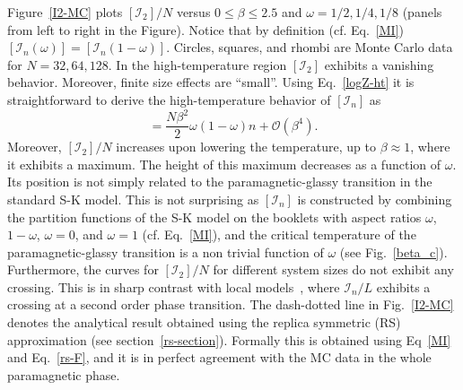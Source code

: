 \documentclass[twocolumn,superscriptaddress,prb,10pt]{revtex4-1}
\begin{document}
Figure~\ref{I2-MC} plots $[{\mathcal I}_2]/N$ versus $0\le\beta\le 2.5$ and $\omega=1/2,1/4,1/8$ 
(panels from left to right in the Figure). Notice that by definition (cf. Eq.~\eqref{MI}) 
$[{\mathcal I}_n(\omega)]=[{\mathcal I}_n(1-\omega)]$. Circles, squares, and rhombi 
are Monte Carlo data for $N=32,64,128$. In the high-temperature region $[{\mathcal I}_2]$ 
exhibits a vanishing behavior. Moreover, finite size effects are 
``small''. Using Eq.~\eqref{logZ-ht} it is straightforward to derive the high-temperature 
behavior of $[{\mathcal I}_n]$ as  
%
\begin{equation}
[{\mathcal I}_n]=\frac{N\beta^2}{2}\omega(1-\omega)n+{\mathcal O}
(\beta^4).
\end{equation}
%
Moreover, $[{\mathcal I}_2]/N$ increases upon lowering the temperature, up to $\beta\approx 1$, 
where it exhibits a maximum. The height of this  
maximum decreases as a function of $\omega$. Its position is not simply related to the 
paramagnetic-glassy transition in the standard S-K model. This is not surprising 
as $[{\mathcal I}_n]$ is constructed by combining the partition functions of the S-K model 
on the booklets with aspect ratios $\omega$, $1-\omega$, $\omega=0$, and $\omega=1$ (cf. Eq.~\eqref{MI}), 
and the critical temperature of the paramagnetic-glassy transition is a non trivial 
function of $\omega$ (see Fig.~\ref{beta_c}). 
Furthermore, the curves for $[{\mathcal I}_2]/N$ for different system sizes do not exhibit any 
crossing. This is in sharp contrast with local models~\cite{jaconis-2013}, where ${\mathcal I}_n/L$ 
exhibits a crossing at a second order phase transition. 
The dash-dotted line in Fig.~\ref{I2-MC} denotes the analytical result obtained using the replica 
symmetric (RS) approximation (see section~\ref{rs-section}). Formally this is obtained using 
Eq~\eqref{MI} and Eq.~\eqref{rs-F}, and it is in perfect agreement with the MC data in the whole 
paramagnetic phase.  
\end{document}

